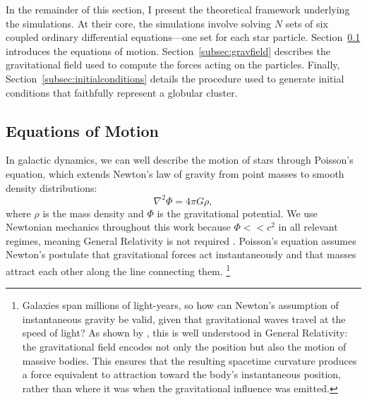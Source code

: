     In the remainder of this section, I present the theoretical framework underlying the simulations. At their core, the simulations involve solving \(N\) sets of six coupled ordinary differential equations—one set for each star particle. Section~\ref{subsec:myEquationsOfMotion} introduces the equations of motion. Section~\ref{subsec:gravfield} describes the gravitational field used to compute the forces acting on the particles. Finally, Section~\ref{subsec:initialconditions} details the procedure used to generate initial conditions that faithfully represent a globular cluster.
    \subsection{Equations of Motion} \label{subsec:myEquationsOfMotion}
        In galactic dynamics, we can well describe the motion of stars through Poisson's equation, which extends Newton's law of gravity from point masses to smooth density distributions: 
        \begin{equation} \label{eq:poissonsequation}
            \nabla^2 \Phi = 4\pi G \rho,
        \end{equation}
        where $\rho$ is the mass density and $\Phi$ is the gravitational potential. We use Newtonian mechanics throughout this work because $\Phi << c^2$ in all relevant regimes, meaning General Relativity is not required \citep[see Appendix C of][]{bovy_inprep}. Poisson's equation assumes Newton's postulate that gravitational forces act instantaneously and that masses attract each other along the line connecting them. \footnote{Galaxies span millions of light-years, so how can Newton's assumption of instantaneous gravity be valid, given that gravitational waves travel at the speed of light? As shown by \citet{2000PhLA..267...81C}, this is well understood in General Relativity: the gravitational field encodes not only the position but also the motion of massive bodies. This ensures that the resulting spacetime curvature produces a force equivalent to attraction toward the body's instantaneous position, rather than where it was when the gravitational influence was emitted.}

